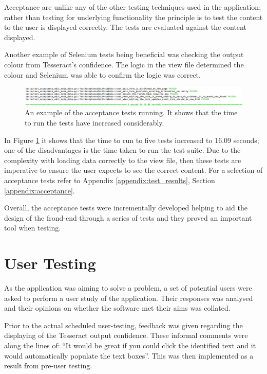 Acceptance are unlike any of the other testing techniques used in the application; rather than testing for underlying functionality the principle is to test the content to the user is displayed correctly. The tests are evaluated against the content displayed.

Another example of Selenium tests being beneficial was checking the output colour from Tesseract's confidence. The logic in the view file determined the colour and Selenium was able to confirm the logic was correct.

\begin{figure}[h!]
  \centering
  \includegraphics[width=\textwidth]{images/acceptance_test_1}
  \caption{An example of the acceptance tests running. It shows that the time to run the tests have increased considerably.}
  \label{fig:acceptance_test_1}
\end{figure}

In Figure \ref{fig:acceptance_test_1} it shows that the time to run to five tests increased to 16.09 seconds; one of the disadvantages is the time taken to run the test-suite. Due to the complexity with loading data correctly to the view file, then these tests are imperative to ensure the user expects to see the correct content. For a selection of acceptance tests refer to Appendix \ref{appendix:test_results}, Section \ref{appendix:acceptance}.

Overall, the acceptance tests were incrementally developed helping to aid the design of the frond-end through a series of tests and they proved an important tool when testing.

\section{User Testing}
As the application was aiming to solve a problem, a set of potential users were asked to perform a user study of the application. Their responses was analysed and their opinions on whether the software met their aims was collated.

Prior to the actual scheduled user-testing, feedback was given regarding the displaying of the Tesseract output confidence. These informal comments were along the lines of: ``It would be great if you could click the identified text and it would automatically populate the text boxes''. This was then implemented as a result from pre-user testing.

